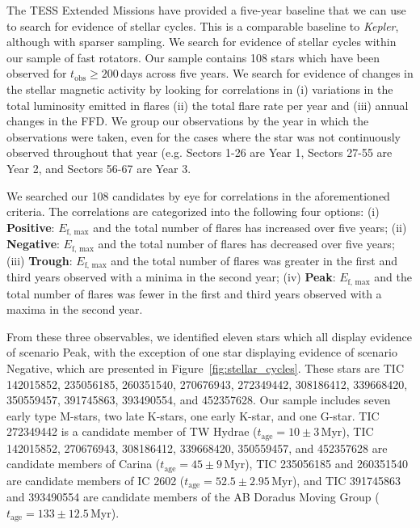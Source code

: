 \documentclass[twocolumn]{aastex631}
\begin{document}
The TESS Extended Missions have provided a five-year baseline that we can use to
search for evidence of stellar cycles. This is a comparable baseline to \textit{Kepler},
although with sparser sampling. We search for evidence of stellar cycles  within
our sample of fast rotators. Our sample contains 108 stars which have been observed
for $t_\textrm{obs} \geq 200$\,days across five years. We search for evidence of
changes in the stellar magnetic activity by looking for correlations in (i)
variations in the total luminosity emitted in flares  (ii) the total flare rate
per year and (iii) annual changes in the FFD.  We group our observations by the
year in which the observations were taken, even for the cases where the star was
not continuously observed throughout that year (e.g. Sectors 1-26 are Year 1,
Sectors 27-55 are Year 2, and Sectors 56-67 are Year 3.

We searched our 108 candidates by eye for correlations in the aforementioned criteria.
The correlations are categorized into the following four options: (i) \textbf{Positive}:
$E_\textrm{f, max}$ and the total number of flares has increased over five years; (ii)
\textbf{Negative}:  $E_\textrm{f, max}$ and the total number of flares has decreased
over five years; (iii) \textbf{Trough}: $E_\textrm{f, max}$ and the total number of
flares was greater in the first and third years observed with a minima in the second
year; (iv) \textbf{Peak}:  $E_\textrm{f, max}$ and the total number of flares was
fewer in the first and third years observed with a maxima in the second year.

From these three observables, we identified eleven stars which all display evidence
of scenario Peak, with the exception of one star displaying evidence of scenario
Negative, which are presented in Figure~\ref{fig:stellar_cycles}. These stars are TIC
142015852, 235056185, 260351540, 270676943, 272349442, 308186412, 339668420, 350559457,
391745863, 393490554, and 452357628.  Our sample includes seven early type M-stars,
two late K-stars, one early K-star, and one G-star. TIC 272349442 is a candidate member
of TW Hydrae ($t_\textrm{age} = 10 \pm 3$\,Myr), TIC 142015852, 270676943, 308186412,
339668420, 350559457, and 452357628 are candidate members of Carina
($t_\textrm{age} = 45 \pm 9$\,Myr), TIC 235056185 and  260351540 are candidate members
of IC 2602 ($t_\textrm{age} = 52.5 \pm 2.95$\,Myr), and TIC 391745863 and 393490554
are candidate members of the AB Doradus Moving Group ($t_\textrm{age} = 133 \pm 12.5$\,Myr).
\end{document}
